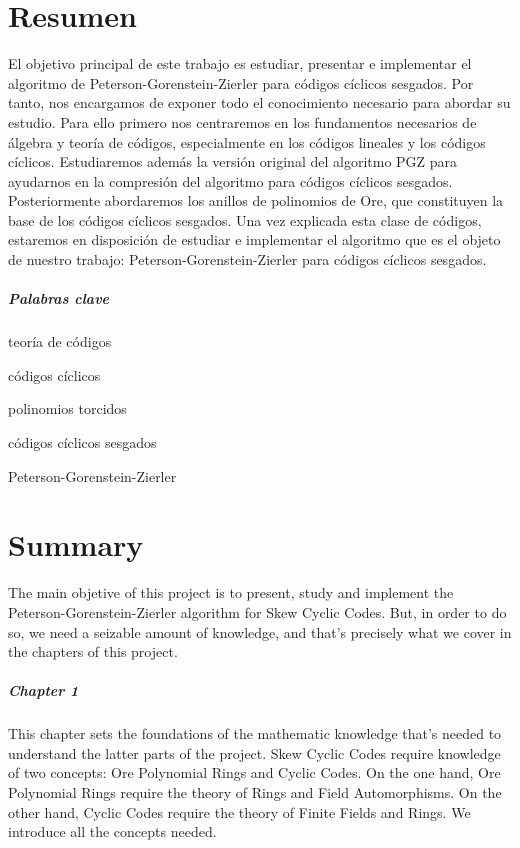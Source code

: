 \chapter*{Resumen}

El objetivo principal de este trabajo es estudiar, presentar e implementar el algoritmo de Peterson-Gorenstein-Zierler para códigos cíclicos sesgados.
Por tanto, nos encargamos de exponer todo el conocimiento necesario para abordar su estudio.
Para ello primero nos centraremos en los fundamentos necesarios de álgebra y teoría de códigos, especialmente en los códigos lineales y los códigos cíclicos.
Estudiaremos además la versión original del algoritmo PGZ para ayudarnos en la compresión del algoritmo para códigos cíclicos sesgados.
Posteriormente abordaremos los anillos de polinomios de Ore, que constituyen la base de los códigos cíclicos sesgados.
Una vez explicada esta clase de códigos, estaremos en disposición de estudiar e implementar el algoritmo que es el objeto de nuestro trabajo:  Peterson-Gorenstein-Zierler para códigos cíclicos sesgados.

\paragraph{Palabras clave}
\begin{itemize*}[label=,itemsep=4em,itemjoin=\hspace{2em}]
  \item teoría de códigos
  \item códigos cíclicos
  \item polinomios torcidos
  \item códigos cíclicos sesgados
  \item Peterson-Gorenstein-Zierler
\end{itemize*}

\chapter*{Summary}

The main objetive of this project is to present, study and implement the Peterson-Gorenstein-Zierler algorithm for Skew Cyclic Codes.
But, in order to do so, we need a seizable amount of knowledge, and that's precisely what we cover in the chapters of this project.

\paragraph{Chapter 1} This chapter sets the foundations of the mathematic knowledge that's needed to understand the latter parts of the project. 
Skew Cyclic Codes require knowledge of two concepts: Ore Polynomial Rings and Cyclic Codes. 
On the one hand, Ore Polynomial Rings require the theory of Rings and Field Automorphisms. 
On the other hand, Cyclic Codes require the theory of Finite Fields and Rings. 
We introduce all the concepts needed.


